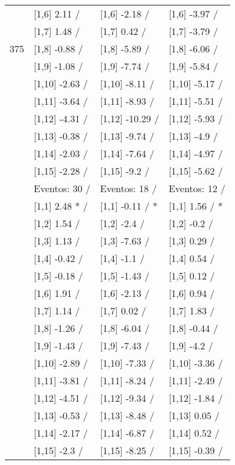 \begin{table}
\begin{tabular}[t]{llll}
 & {}[1,6] 2.11  / & {}[1,6] -2.18  / & {}[1,6] -3.97  /\\
 & {}[1,7] 1.48  / & {}[1,7] 0.42  / & {}[1,7] -3.79  /\\
375 & {}[1,8] -0.88  / & {}[1,8] -5.89  / & {}[1,8] -6.06  /\\
\addlinespace
 & {}[1,9] -1.08  / & {}[1,9] -7.74  / & {}[1,9] -5.84  /\\
 & {}[1,10] -2.63  / & {}[1,10] -8.11  / & {}[1,10] -5.17  /\\
 & {}[1,11] -3.64  / & {}[1,11] -8.93  / & {}[1,11] -5.51  /\\
 & {}[1,12] -4.31  / & {}[1,12] -10.29  / & {}[1,12] -5.93  /\\
 & {}[1,13] -0.38  / & {}[1,13] -9.74  / & {}[1,13] -4.9  /\\
\addlinespace
 & {}[1,14] -2.03  / & {}[1,14] -7.64  / & {}[1,14] -4.97  /\\
 & {}[1,15] -2.28  / & {}[1,15] -9.2  / & {}[1,15] -5.62  /\\
 & Eventos:  30 / & Eventos:  18 / & Eventos:  12 /\\
 & {}[1,1] 2.48 * / & {}[1,1] -0.11  / * & {}[1,1] 1.56  / *\\
 & {}[1,2] 1.54  / & {}[1,2] -2.4  / & {}[1,2] -0.2  /\\
\addlinespace
 & {}[1,3] 1.13  / & {}[1,3] -7.63  / & {}[1,3] 0.29  /\\
 & {}[1,4] -0.42  / & {}[1,4] -1.1  / & {}[1,4] 0.54  /\\
 & {}[1,5] -0.18  / & {}[1,5] -1.43  / & {}[1,5] 0.12  /\\
 & {}[1,6] 1.91  / & {}[1,6] -2.13  / & {}[1,6] 0.94  /\\
 & {}[1,7] 1.14  / & {}[1,7] 0.02  / & {}[1,7] 1.83  /\\
\addlinespace
500 & {}[1,8] -1.26  / & {}[1,8] -6.04  / & {}[1,8] -0.44  /\\
 & {}[1,9] -1.43  / & {}[1,9] -7.43  / & {}[1,9] -4.2  /\\
 & {}[1,10] -2.89  / & {}[1,10] -7.33  / & {}[1,10] -3.36  /\\
 & {}[1,11] -3.81  / & {}[1,11] -8.24  / & {}[1,11] -2.49  /\\
 & {}[1,12] -4.51  / & {}[1,12] -9.34  / & {}[1,12] -1.84  /\\
\addlinespace
 & {}[1,13] -0.53  / & {}[1,13] -8.48  / & {}[1,13] 0.05  /\\
 & {}[1,14] -2.17  / & {}[1,14] -6.87  / & {}[1,14] 0.52  /\\
 & {}[1,15] -2.3  / & {}[1,15] -8.25  / & {}[1,15] -0.39  /\\
\bottomrule
\end{tabular}
\end{table}
